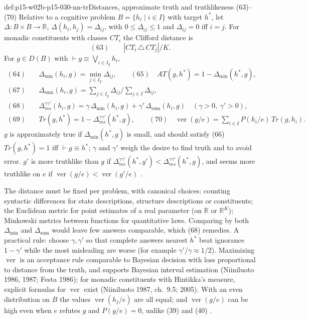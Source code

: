 \begin{hbdefinition}{def:p15-w02b-p15-030-nn-tr}{Distances, approximate truth and truthlikeness (63)--(70)}
Relative to a cognitive problem \(B=\{h_i\mid i\in I\}\) with target
\(h^*\), let \(\Delta:B\times B\to\mathbb R\), \(\Delta(h_i,h_j)=\Delta_{ij}\),
with \(0\leq\Delta_{ij}\leq1\) and \(\Delta_{ij}=0\) iff \(i=j\). For monadic
constituents with classes \(CT_i\) the Clifford distance is
\[
 (63)\qquad |CT_i\,\triangle\, CT_j|/K .
\]
For \(g\in D(B)\) with \(\vdash g\equiv\bigvee_{i\in I_g}h_i\),
\[
\begin{aligned}
 (64)\quad&\Delta_{\min}(h_i,g)=\min_{j\in I_g}\Delta_{ij},\qquad
 (65)\quad AT(g,h^*)=1-\Delta_{\min}(h^*,g),\\
 (67)\quad&\Delta_{\mathrm{sum}}(h_i,g)=\sum_{j\in I_g}\Delta_{ij}\Big/\sum_{j\in I}\Delta_{ij},\\
 (68)\quad&\Delta^{\gamma\gamma'}_{ms}(h_i,g)=\gamma\,\Delta_{\min}(h_i,g)+\gamma'\,\Delta_{\mathrm{sum}}(h_i,g)\quad(\gamma>0,\ \gamma'>0),\\
 (69)\quad&Tr(g,h^*)=1-\Delta^{\gamma\gamma'}_{ms}(h^*,g),\qquad
 (70)\quad \operatorname{ver}(g/e)=\sum_{i\in I}P(h_i/e)\,Tr(g,h_i).
\end{aligned}
\]
\(g\) is approximately true if \(\Delta_{\min}(h^*,g)\) is small, and should
satisfy (66) \(Tr(g,h^*)=1\) iff \(\vdash g\equiv h^*\); \(\gamma\) and \(\gamma'\)
weigh the desire to find truth and to avoid error. \(g'\) is more truthlike
than \(g\) if \(\Delta^{\gamma\gamma'}_{ms}(h^*,g')<\Delta^{\gamma\gamma'}_{ms}(h^*,g)\),
and seems more truthlike on \(e\) if \(\operatorname{ver}(g/e)<\operatorname{ver}(g'/e)\)
\cite[pp.~343--345]{Niiniluoto2011HintikkaProgramReading}.
\end{hbdefinition}

The distance must be fixed per problem, with canonical choices: counting
syntactic differences for state descriptions, structure descriptions or
constituents; the Euclidean metric for point estimates of a real
parameter (on \(\mathbb R\) or \(\mathbb R^K\)); Minkowski metrics between
functions for quantitative laws. Comparing by both \(\Delta_{\min}\) and
\(\Delta_{\mathrm{sum}}\) would leave few answers comparable, which (68)
remedies. A practical rule: choose \(\gamma,\gamma'\) so that complete answers
nearest \(h^*\) beat ignorance \(1-\gamma'\) while the most misleading are
worse (for example \(\gamma'/\gamma\approx1/2\)). Maximizing \(\operatorname{ver}\)
is an acceptance rule comparable to Bayesian decision with loss
proportional to distance from the truth, and supports Bayesian interval
estimation (Niiniluoto 1986, 1987; Festa 1986); for monadic constituents
with Hintikka's measure, explicit formulas for \(\operatorname{ver}\) exist
(Niiniluoto 1987, ch.~9.5; 2005). With an even distribution on \(B\) the
values \(\operatorname{ver}(h_j/e)\) are all equal; and \(\operatorname{ver}(g/e)\)
can be high even when \(e\) refutes \(g\) and \(P(g/e)=0\), unlike (39) and (40)
\cite[pp.~344--345]{Niiniluoto2011HintikkaProgramReading}.

